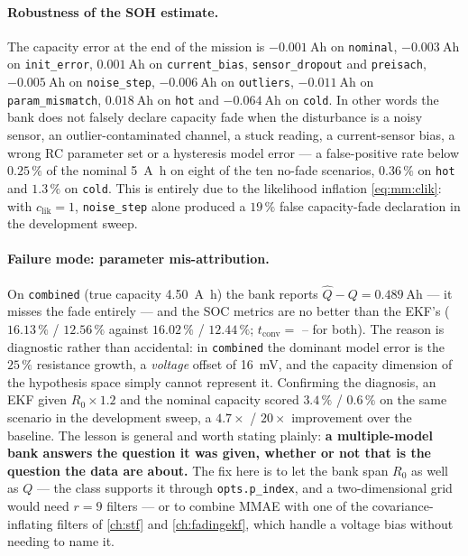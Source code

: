\paragraph{Robustness of the SOH estimate.}  The capacity error at the end of the mission is
$\SI{-0.001}{\ampere\hour}$ on \texttt{nominal}, $\SI{-0.003}{\ampere\hour}$ on \texttt{init\_error},
$\SI{+0.001}{\ampere\hour}$ on \texttt{current\_bias}, \texttt{sensor\_dropout} and
\texttt{preisach}, $\SI{-0.005}{\ampere\hour}$ on \texttt{noise\_step},
$\SI{-0.006}{\ampere\hour}$ on \texttt{outliers}, $\SI{-0.011}{\ampere\hour}$ on
\texttt{param\_mismatch}, $\SI{+0.018}{\ampere\hour}$ on \texttt{hot} and
$\SI{-0.064}{\ampere\hour}$ on \texttt{cold}.  In other words the bank does not falsely declare
capacity fade when the disturbance is a noisy sensor, an outlier-contaminated channel, a stuck
reading, a current-sensor bias, a wrong RC parameter set or a hysteresis model error --- a
false-positive rate below $0.25\,\%$ of the nominal \SI{5}{\ampere\hour} on eight of the ten
no-fade scenarios, $0.36\,\%$ on \texttt{hot} and $1.3\,\%$ on \texttt{cold}.  This is entirely due to the likelihood inflation \eqref{eq:mm:clik}: with
$c_\mathrm{lik}=1$, \texttt{noise\_step} alone produced a $19\,\%$ false capacity-fade declaration in
the development sweep.

\paragraph{Failure mode: parameter mis-attribution.}  On \texttt{combined} (true capacity
\SI{4.50}{\ampere\hour}) the bank reports $\hat Q-Q=\SI{+0.489}{\ampere\hour}$ --- it misses the fade
entirely --- and the SOC metrics are no better than the EKF's ($16.13\,\%$ / $12.56\,\%$ against
$16.02\,\%$ / $12.44\,\%$; $t_\mathrm{conv}=$ -- for both).  The reason is diagnostic rather than
accidental: in \texttt{combined} the dominant model error is the $25\,\%$ resistance growth, a
\emph{voltage} offset of \SI{16}{\milli\volt}, and the capacity dimension of the hypothesis space
simply cannot represent it.  Confirming the diagnosis, an EKF given $R_0\times1.2$ and the nominal
capacity scored $3.4\,\%$ / $0.6\,\%$ on the same scenario in the development sweep, a $4.7\times$ /
$20\times$ improvement over the baseline.  The lesson is general and worth stating plainly:
\textbf{a multiple-model bank answers the question it was given, whether or not that is the question
the data are about.}  The fix here is to let the bank span $R_0$ as well as $Q$ --- the class supports
it through \texttt{opts.p\_index}, and a two-dimensional grid would need $r=9$ filters --- or to
combine MMAE with one of the covariance-inflating filters of \cref{ch:stf} and \cref{ch:fadingekf},
which handle a voltage bias without needing to name it.

